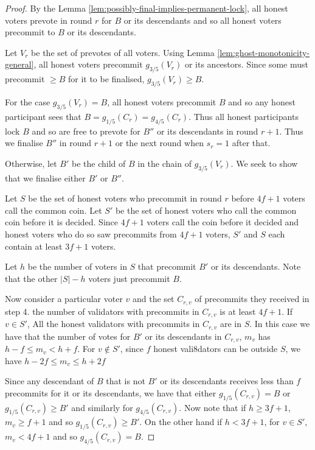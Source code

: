 \documentclass{article}
\begin{document}
{\begin{proof} By the Lemma \ref{lem:possibly-final-implies-permanent-lock}, all honest voters prevote in round $r$ for $B$ or its descendants and so all honest voters precommit to $B$ or its descendants.

Let $V_r$ be the set of prevotes of all voters.  Using Lemma \ref{lem:ghost-monotonicity-general}, all honest voters precommit $g_{3/5}(V_r)$ or its ancestors. Since some must precommit $\geq B$ for it to be finalised,  $g_{3/5}(V_r) \geq B$.

For the case $g_{3/5}(V_r)=B$, all honest voters precommit $B$ and so any honest participant sees that
$B = g_{1/5}(C_r) = g_{4/5}(C_r)$. Thus all honest participants
lock $B$ and so are free to prevote for $B''$ or its descendants in round $r+1$. Thus we finalise $B''$ in round $r+1$ or the next round when $s_r=1$ after that.

Otherwise, let $B'$ be the child of $B$ in the chain of $g_{3/5}(V_r)$. We seek to show that we finalise either $B'$ or $B''$.

Let $S$ be the set of honest voters who precommit in round $r$ before $4f+1$ voters call the common coin. Let $S'$ be the set of honest voters who call the common coin before it is decided. %
Since $4f+1$  voters call the coin before it decided and honest voters who do so saw precommits from $4f+1$ voters, $S'$ and $S$ each contain at least $3f+1$ voters.

Let $h$ be the number of voters in $S$ that precommit $B'$ or its descendants. Note that the other $|S|-h$ voters just precommit $B$.

Now consider a particular voter $v$ and the set $C_{r,v}$ of precommits they received in step 4. the number of validators with precommits in  $C_{r,v}$ is at least $4f+1$. 
If $v \in S'$,
All the honest validators  
with precommits in $C_{r,v}$ are in $S$. In this case we have that the number of votes for $B'$ or its descendants in $C_{r,v}$, $m_v$ has $h-f \leq m_v < h+f$. For $v \notin S'$, since $f$ honest vali8dators can be outside $S$, we have $h-2f \leq m_v \leq h+2f$ 

Since any descendant of $B$ that is not $B'$ or its descendants receives less than $f$ precommits for it or its descendants, we have that either $g_{1/5}(C_{r,v})=B$ or $g_{1/5}(C_{r,v})\geq B'$ and similarly for $g_{4/5}(C_{r,v})$. Now note that if $h \geq 3f+1$, $m_v \geq f+1$ and so $g_{1/5}(C_{r,v}) \geq B'$. On the other hand if $h < 3f+1$, for $v \in S'$, $m_v < 4f+1$ and so $g_{4/5}(C_{r,v})=B$.


\end{proof}}
\end{document}
